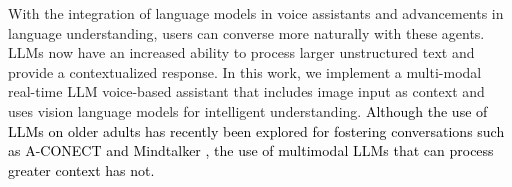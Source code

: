 With the integration of language models in voice assistants and advancements in language understanding, users can converse more naturally with these agents. LLMs now have an increased ability to process larger unstructured text and provide a contextualized response. In this work, we implement a multi-modal real-time LLM voice-based assistant that includes image input as context and uses vision language models for intelligent understanding. \textcolor{black}{Although the use of LLMs on older adults has recently been explored for fostering conversations such as A-CONECT \cite{hong2024aconect} and Mindtalker \cite{xygkou2024mindtalker}, the use of multimodal LLMs that can process greater context has not.}


